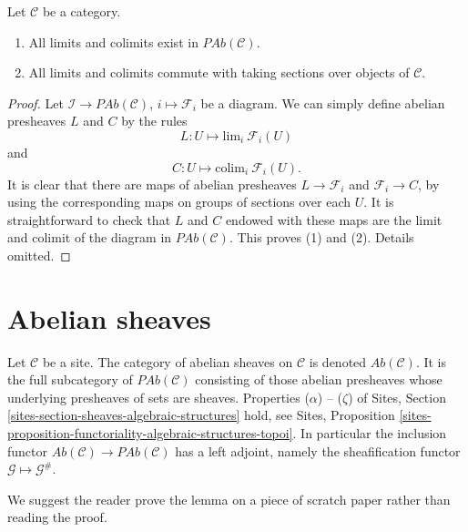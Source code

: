 \begin{lemma}
\label{lemma-limits-colimits-abelian-presheaves}
Let $\mathcal{C}$ be a category.
\begin{enumerate}
\item All limits and colimits exist in $\textit{PAb}(\mathcal{C})$.
\item All limits and colimits commute with taking sections over objects of
$\mathcal{C}$.
\end{enumerate}
\end{lemma}

\begin{proof}
Let $\mathcal{I} \to \textit{PAb}(\mathcal{C})$, $i \mapsto \mathcal{F}_i$
be a diagram. We can simply define abelian presheaves
$L$ and $C$ by the rules
$$
L : U \longmapsto \text{lim}_i\ \mathcal{F}_i(U)
$$
and
$$
C : U \longmapsto \text{colim}_i\ \mathcal{F}_i(U).
$$
It is clear that there are maps of abelian presheaves $L \to \mathcal{F}_i$
and $\mathcal{F}_i \to C$, by using the corresponding maps on groups of
sections over each $U$. It is straightforward to check that $L$ and $C$ endowed
with these maps are the limit and colimit of the diagram in
$\textit{PAb}(\mathcal{C})$. This proves (1) and (2). Details omitted.
\end{proof}


\section{Abelian sheaves}
\label{section-abelian-sheaves}

\noindent
Let $\mathcal{C}$ be a site.
The category of abelian sheaves on $\mathcal{C}$ is denoted
$\textit{Ab}(\mathcal{C})$. It is the full subcategory of
$\textit{PAb}(\mathcal{C})$ consisting of those abelian presheaves
whose underlying presheaves of sets are sheaves.
Properties ($\alpha$) -- ($\zeta$) of
Sites, Section \ref{sites-section-sheaves-algebraic-structures}
hold, see
Sites,
Proposition \ref{sites-proposition-functoriality-algebraic-structures-topoi}.
In particular the inclusion functor
$\textit{Ab}(\mathcal{C}) \to \textit{PAb}(\mathcal{C})$
has a left adjoint, namely the sheafification functor
$\mathcal{G} \mapsto \mathcal{G}^\#$.

\medskip\noindent
We suggest the reader prove the lemma on a piece of scratch paper rather
than reading the proof.

